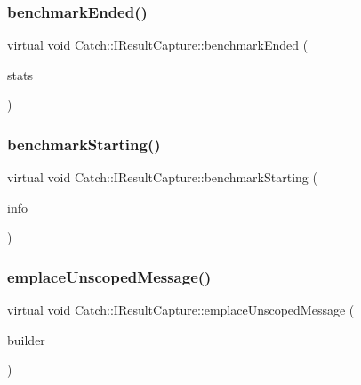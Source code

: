\subsubsection{\texorpdfstring{benchmarkEnded()}{benchmarkEnded()}}
{\footnotesize\ttfamily virtual void Catch\+::\+I\+Result\+Capture\+::benchmark\+Ended (\begin{DoxyParamCaption}\item[{Benchmark\+Stats const \&}]{stats }\end{DoxyParamCaption})\hspace{0.3cm}{\ttfamily [pure virtual]}}

\mbox{\label{struct_catch_1_1_i_result_capture_a264ae12330c74b2daae41715a30d51bf}} 
\subsubsection{\texorpdfstring{benchmarkStarting()}{benchmarkStarting()}}
{\footnotesize\ttfamily virtual void Catch\+::\+I\+Result\+Capture\+::benchmark\+Starting (\begin{DoxyParamCaption}\item[{Benchmark\+Info const \&}]{info }\end{DoxyParamCaption})\hspace{0.3cm}{\ttfamily [pure virtual]}}

\mbox{\label{struct_catch_1_1_i_result_capture_a49f74f1323ef8be71b8f9b8e8b2c0fc2}} 
\subsubsection{\texorpdfstring{emplaceUnscopedMessage()}{emplaceUnscopedMessage()}}
{\footnotesize\ttfamily virtual void Catch\+::\+I\+Result\+Capture\+::emplace\+Unscoped\+Message (\begin{DoxyParamCaption}\item[{\mbox{\hyperlink{struct_catch_1_1_message_builder}{Message\+Builder}} const \&}]{builder }\end{DoxyParamCaption})\hspace{0.3cm}{\ttfamily [pure virtual]}}

